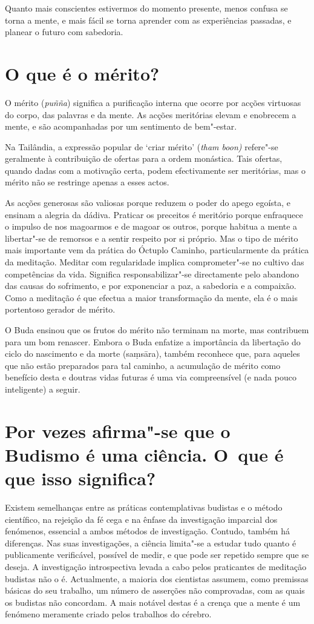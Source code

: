 Quanto mais conscientes estivermos do momento presente, menos confusa se
torna a mente, e mais fácil se torna aprender com as experiências
passadas, e planear o futuro com sabedoria.

\section{O que é o mérito?}

O mérito (\emph{puñña}) significa a purificação interna que ocorre por
acções virtuosas do corpo, das palavras e da mente. As acções meritórias
elevam e enobrecem a mente, e são acompanhadas por um sentimento de
bem"-estar.

Na Tailândia, a expressão popular de `criar mérito' (\emph{tham boon)}
refere"-se geralmente à contribuição de ofertas para a ordem monástica.
Tais ofertas, quando dadas com a motivação certa, podem efectivamente
ser meritórias, mas o mérito não se restringe apenas a esses actos.

As acções generosas são valiosas porque reduzem o poder do apego
egoísta, e ensinam a alegria da dádiva. Praticar os preceitos é
meritório porque enfraquece o impulso de nos magoarmos e de magoar os
outros, porque habitua a mente a libertar"-se de remorsos e a sentir
respeito por si próprio. Mas o tipo de mérito mais importante vem da
prática do Óctuplo Caminho, particularmente da prática da meditação.
Meditar com regularidade implica comprometer"-se no cultivo das
competências da vida. Significa responsabilizar"-se directamente pelo
abandono das causas do sofrimento, e por exponenciar a paz, a sabedoria
e a compaixão. Como a meditação é que efectua a maior transformação da
mente, ela é o mais portentoso gerador de mérito.

O Buda ensinou que os frutos do mérito não terminam na morte, mas
contribuem para um bom renascer. Embora o Buda enfatize a importância da
libertação do ciclo do nascimento e da morte (saṃsāra), também reconhece
que, para aqueles que não estão preparados para tal caminho, a
acumulação de mérito como benefício desta e doutras vidas futuras é uma
via compreensível (e nada pouco inteligente) a seguir.

\section{Por vezes afirma"-se que o Budismo é uma ciência. O~que é que isso
  significa?}

Existem semelhanças entre as práticas contemplativas budistas e o método
científico, na rejeição da fé cega e na ênfase da investigação imparcial
dos fenómenos, essencial a ambos métodos de investigação. Contudo,
também há diferenças. Nas suas investigações, a ciência limita"-se a
estudar tudo quanto é publicamente verificável, possível de medir, e que
pode ser repetido sempre que se deseja. A investigação introspectiva
levada a cabo pelos praticantes de meditação budistas não o é.
Actualmente, a maioria dos cientistas assumem, como premissas básicas do
seu trabalho, um número de asserções não comprovadas, com as quais os
budistas não concordam. A mais notável destas é a crença que a mente é
um fenómeno meramente criado pelos trabalhos do cérebro.

